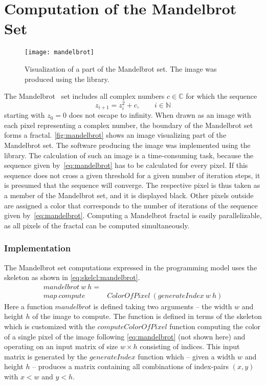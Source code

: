 \section{Computation of the Mandelbrot Set}

\begin{figure}[tb]
  \centering
  \texttt{[image: mandelbrot]}
  \caption[Visualization of a part of the Mandelbrot set.]%
          {Visualization of a part of the Mandelbrot set. The image was produced using the \SkelCL library.}
  \label{fig:mandelbrot}
\end{figure}

The Mandelbrot~\cite{Mandelbrot1980} set includes all complex numbers $c \in {\mathbb C}$ for which the sequence
\begin{equation}
	z_{i+1} = z_{i}^{2} + c,\qquad i\in {\mathbb N}
	\label{eq:mandelbrot}
\end{equation}
starting with $z_{0}=0$ does not escape to infinity.
When drawn as an image with each pixel representing a complex number, the boundary of the Mandelbrot set forms a fractal.
\autoref{fig:mandelbrot} shows an image visualizing part of the Mandelbrot set.
The software producing the image was implemented using the \SkelCL library. 
The calculation of such an image is a time-consuming task, because the sequence given by~\autoref{eq:mandelbrot} has to be calculated for every pixel.
If this sequence does not cross a given threshold for a given number of iteration steps, it is presumed that the sequence will converge.
The respective pixel is thus taken as a member of the Mandelbrot set, and it is displayed black.
Other pixels outside are assigned a color that corresponds to the number of iterations of the sequence given by~\autoref{eq:mandelbrot}.
Computing a Mandelbrot fractal is easily parallelizable, as all pixels of the fractal can be computed simultaneously.

\subsubsection*{\SkelCL Implementation}
\label{sec:mandelbrot:implementation}
The Mandelbrot set computations expressed in the \SkelCL programming model uses the \map skeleton as shown in \autoref{eq:skelcl:mandelbrot}.
\begin{align}
  mandelbrot\ w\ h =&  \nonumber\\
         map\ compute&ColorOfPixel\ (generateIndex\ w\ h)
  \label{eq:skelcl:mandelbrot}
\end{align}
Here a function $mandelbrot$ is defined taking two arguments -- the width $w$ and height $h$ of the image to compute.
The function is defined in terms of the \map skeleton which is customized with the $computeColorOfPixel$ function computing the color of a single pixel of the image following \autoref{eq:mandelbrot} (not shown here) and operating on an input matrix of size $w\times h$ consisting of indices.
This input matrix is generated by the $generateIndex$ function which -- given a width $w$ and height $h$ -- produces a matrix containing all combinations of index-pairs $(x,y)$ with $x < w$ and $y < h$.

